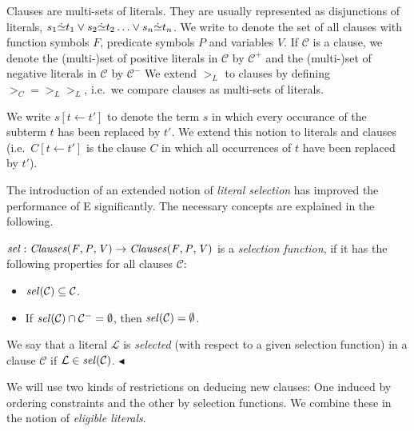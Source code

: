 \documentclass{report}
\begin{document}
Clauses are multi-sets of literals. They are usually represented as
disjunctions of literals, $s_1\dot{\simeq}t_1 \vee s_2\dot{\simeq}t_2 \ldots
\vee s_n\dot{\simeq}t_n$. We write  to denote the set
of all clauses with function symbols $F$, predicate symbols $P$ and
variables $V$. If $\mathcal{C}$ is a clause, we denote the (multi-)set
of positive literals in $\mathcal{C}$ by $\mathcal{C^+}$ and the
(multi-)set of negative literals in $\mathcal{C}$ by $\mathcal{C^-}$
We extend $>_L$ to clauses by defining $>_C = >_L>_L$, i.e.\ we
compare clauses as multi-sets of literals.


We write $s[t\leftarrow t']$ to denote the term $s$ in which every
occurance of the subterm $t$ has been replaced by $t'$. We extend this
notion to literals and clauses (i.e.\ $C[t\leftarrow t']$ is the
clause $C$ in which all occurrences of $t$ have been replaced by
$t'$).

The introduction of an extended notion of \emph{literal selection} has
improved the performance of E significantly. The necessary concepts
are explained in the following.

\begin{definition}
  \label{def:basics:inferences:selection}
  $\mathit{sel}:\mathit{Clauses(F,P,V)} \rightarrow \mathit{Clauses(F,P,V)}$ is a
  \emph{selection function}, if it has the following properties for
  all clauses $\mathcal{C}$:
    \begin{itemize}
    \item $\mathit{sel}(\mathcal{C}) \subseteq \mathcal{C}$.
    \item If $\mathit{sel}(\mathcal{C})\cap \mathcal{C^-} = \emptyset$, then
      $\mathit{sel}(\mathcal{C}) = \emptyset$.
    \end{itemize}
    We say that a literal $\mathcal{L}$ is \emph{selected} (with
    respect to a given selection function) in a clause $\mathcal{C}$
    if $\mathcal{L} \in \mathit{sel}(\mathcal{C})$.
  \hfill$\blacktriangleleft$
\end{definition}

We will use two kinds of restrictions on deducing new clauses: One
induced by ordering constraints and the other by selection functions.
We combine these in the notion of \emph{eligible literals}.
\end{document}
